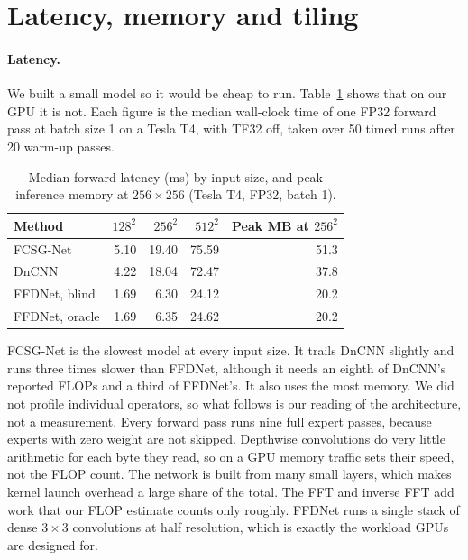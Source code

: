 \documentclass[12pt,a4paper,oneside]{NITR}
\newcommand{\fcsg}{FCSG-Net}
\begin{document}
\section{Latency, memory and tiling}\label{sec:latency}

\paragraph{Latency.} We built a small model so it would be cheap to run.
Table~\ref{tab:latency} shows that on our GPU it is not. Each figure is the
median wall-clock time of one FP32 forward pass at batch size 1 on a Tesla
T4, with TF32 off, taken over 50 timed runs after 20 warm-up passes.

\begin{table}[htbp]
	\centering
	\caption{Median forward latency (ms) by input size, and peak inference memory at $256\times256$ (Tesla T4, FP32, batch 1).}
	\label{tab:latency}
	\begin{tabular}{@{}lrrrr@{}}
		\toprule
		Method & $128^2$ & $256^2$ & $512^2$ & Peak MB at $256^2$ \\
		\midrule
		\fcsg{}          & 5.10 & 19.40 & 75.59 & 51.3 \\
		DnCNN            & 4.22 & 18.04 & 72.47 & 37.8 \\
		FFDNet, blind    & 1.69 &  6.30 & 24.12 & 20.2 \\
		FFDNet, oracle   & 1.69 &  6.35 & 24.62 & 20.2 \\
		\bottomrule
	\end{tabular}
\end{table}

\fcsg{} is the slowest model at every input size. It trails DnCNN slightly
and runs three times slower than FFDNet, although it needs an eighth of
DnCNN's reported FLOPs and a third of FFDNet's. It also uses the most memory.
We did not profile individual operators, so what follows is our reading of
the architecture, not a measurement. Every forward pass runs nine full expert
passes, because experts with zero weight are not skipped. Depthwise
convolutions do very little arithmetic for each byte they read, so on a GPU
memory traffic sets their speed, not the FLOP count. The network is built
from many small layers, which makes kernel launch overhead a large share of
the total. The FFT and inverse FFT add work that our FLOP estimate counts only
roughly. FFDNet runs a single stack of dense $3\times3$ convolutions at half
resolution, which is exactly the workload GPUs are designed for.
\end{document}
